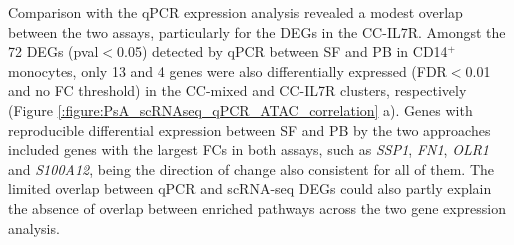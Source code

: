 Comparison with the qPCR expression analysis revealed a modest overlap between the two assays, particularly for the DEGs in the CC-IL7R. Amongst the 72 DEGs (pval$<$0.05) detected by qPCR between SF and PB in CD14$^+$ monocytes, only 13 and 4 genes were also differentially expressed (FDR$<$0.01 and no FC threshold) in the CC-mixed and CC-IL7R clusters, respectively (Figure \ref{:figure:PsA_scRNAseq_qPCR_ATAC_correlation} a). Genes with reproducible differential expression between SF and PB by the two approaches included genes with the largest FCs in both assays, such as \textit{SSP1}, \textit{FN1}, \textit{OLR1} and \textit{S100A12}, being the direction of change also consistent for all of them. %
The limited overlap between qPCR and scRNA-seq DEGs could also partly explain the absence of overlap between enriched pathways across the two gene expression analysis. 
   
